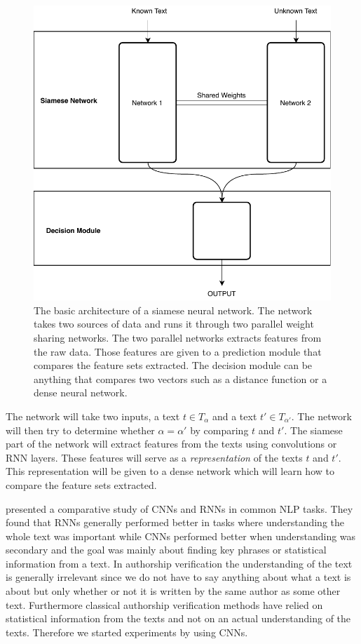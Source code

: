 \begin{figure}
    \centering
    \includegraphics[scale=0.5]{./pictures/method/siamese}
    \caption{The basic architecture of a siamese neural network. The network
        takes two sources of data and runs it through two parallel weight
        sharing networks. The two parallel networks extracts features from the
        raw data. Those features are given to a prediction module that compares
        the feature sets extracted. The decision module can be anything that
        compares two vectors such as a distance function or a dense neural
        network.}
    \label{fig:siamese_example}
\end{figure}

The network will take two inputs, a text $t \in T_\alpha$ and a text $t' \in
T_{\alpha'}$. The network will then try to determine whether $\alpha = \alpha'$
by comparing $t$ and $t'$. The siamese part of the network will extract features
from the texts using convolutions or \gls{RNN} layers. These features will serve
as a \textit{representation} of the texts $t$ and $t'$. This representation will
be given to a dense network which will learn how to compare the feature sets
extracted.

\citet{DBLP:journals/corr/0001KYS17} presented a comparative study of
\glspl{CNN} and \glspl{RNN} in common \gls{NLP} tasks. They found that
\glspl{RNN} generally performed better in tasks where understanding the whole
text was important while \glspl{CNN} performed better when understanding was
secondary and the goal was mainly about finding key phrases or statistical
information from a text. In authorship verification the understanding of the
text is generally irrelevant since we do not have to say anything about what a
text is about but only whether or not it is written by the same author as some
other text. Furthermore classical authorship verification methods have relied on
statistical information from the texts and not on an actual understanding of the
texts. Therefore we started experiments by using \glspl{CNN}.

